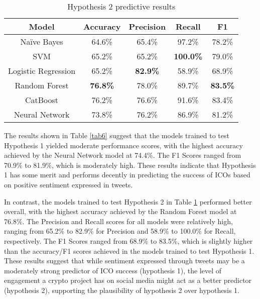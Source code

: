 \documentclass[runningheads]{llncs}
\begin{document}
\begin{table}[htbp]
\caption{Hypothesis 2 predictive results}
\begin{center}
\begin{tabular}{|c|c|c|c|c|}
\hline
\textbf{Model} & \textbf{Accuracy} & \textbf{Precision} & \textbf{Recall} & \textbf{F1} \\
\hline
Naïve Bayes & 64.6\% & 65.4\% & 97.2\% & 78.2\% \\
\hline
SVM & 65.2\% & 65.2\% & \textbf{100.0\%} & 79.0\% \\
\hline
Logistic Regression & 65.2\% & \textbf{82.9\%} & 58.9\% & 68.9\% \\
\hline
Random Forest & \textbf{76.8\%} & 78.0\% & 89.7\% & \textbf{83.5\%} \\
\hline
CatBoost & 76.2\% & 76.6\% & 91.6\% & 83.4\% \\
\hline
Neural Network & 73.8\% & 76.2\% & 86.9\% & 81.2\% \\
\hline
\end{tabular}
\label{tab7}
\end{center}
\end{table}

The results shown in Table \ref{tab6} suggest that the models trained to test Hypothesis 1 yielded moderate performance scores, with the highest accuracy achieved by the Neural Network model at 74.4\%. The F1 Scores ranged from 70.9\% to 81.9\%, which is moderately high. These results indicate that Hypothesis 1 has some merit and performs decently in predicting the success of ICOs based on positive sentiment expressed in tweets.

In contrast, the models trained to test Hypothesis 2 in Table \ref{tab7} performed better overall, with the highest accuracy achieved by the Random Forest model at 76.8\%. The Precision and Recall scores for all models were relatively high, ranging from 65.2\% to 82.9\% for Precision and 58.9\% to 100.0\% for Recall, respectively. The F1 Scores ranged from 68.9\% to 83.5\%, which is slightly higher than the accuracy/F1 scores achieved in the models trained to test Hypothesis 1. These results suggest that while sentiment expressed through tweets may be a moderately strong predictor of ICO success (hypothesis 1), the level of engagement a crypto project has on social media might act as a better predictor (hypothesis 2), supporting the plausibility of hypothesis 2 over hypothesis 1.
\end{document}
